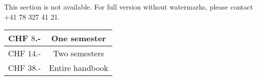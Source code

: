 \documentclass[../main.tex]{subfiles}
\begin{document}
This section is not available. For full version without watermarks, please contact +41 78 327 41 21.\\
\begin{table}[hbt!]
    \centering
    \begin{tabular}{c||c}
        CHF $8$.- & One semester \\ \hline
        CHF $14$.- & Two semesters \\ \hline
        CHF $38$.- & Entire handbook
    \end{tabular}
\end{table}
\end{document}

